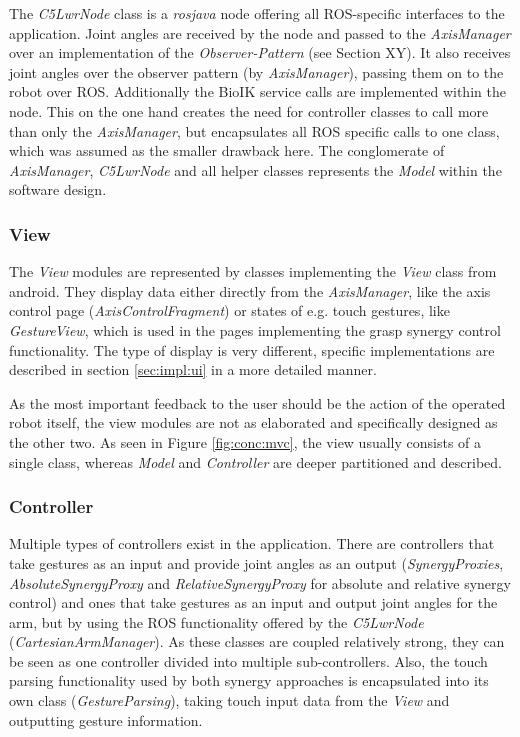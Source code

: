 The \textit{C5LwrNode} class is a \textit{rosjava} node offering all ROS-specific interfaces to the application. Joint angles are received by the node and passed to the \textit{AxisManager} over an implementation of the \textit{Observer-Pattern} (see Section XY). It also receives joint angles over the observer pattern (by \textit{AxisManager}), passing them on to the robot over ROS. Additionally the BioIK service calls are implemented within the node. This on the one hand creates the need for controller classes to call more than only the \textit{AxisManager}, but encapsulates all ROS specific calls to one class, which was assumed as the smaller drawback here. The conglomerate of \textit{AxisManager}, \textit{C5LwrNode} and all helper classes represents the \textit{Model} within the software design.

\subsubsection{View}

The \textit{View} modules are represented by classes implementing the \textit{View} class from android. They display data either directly from the \textit{AxisManager}, like the axis control page (\textit{AxisControlFragment}) or states of e.g. touch gestures, like \textit{GestureView}, which is used in the pages implementing the grasp synergy control functionality. The type of display is very different, specific implementations are described in section \ref{sec:impl:ui} in a more detailed manner.

As the most important feedback to the user should be the action of the operated robot itself, the view modules are not as elaborated and specifically designed as the other two. As seen in Figure \ref{fig:conc:mvc}, the view usually consists of a single class, whereas \textit{Model} and \textit{Controller} are deeper partitioned and described.

\subsubsection{Controller}

Multiple types of controllers exist in the application. There are controllers that take gestures as an input and provide joint angles as an output (\textit{SynergyProxies}, \textit{AbsoluteSynergyProxy} and \textit{RelativeSynergyProxy} for absolute and relative synergy control) and ones that take gestures as an input and output joint angles for the arm, but by using the ROS functionality offered by the \textit{C5LwrNode} (\textit{CartesianArmManager}). As these classes are coupled relatively strong, they can be seen as one controller divided into multiple sub-controllers. Also, the touch parsing functionality used by both synergy approaches is encapsulated into its own class (\textit{GestureParsing}), taking touch input data from the \textit{View} and outputting gesture information.

